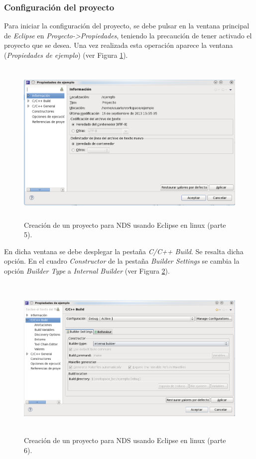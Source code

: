 \subsubsection{Configuración del proyecto}
Para iniciar la configuración del proyecto, se debe pulsar en la ventana principal de \textit{Eclipse} en \textit{Proyecto->Propiedades}, teniendo la precaución de tener activado el proyecto que se desea. Una vez realizada esta operación aparece la ventana (\textit{Propiedades de ejemplo}) (ver Figura \ref{fig_pig_p3_c1_eclipel5}).

\begin{figure}[t]
	\centering
	\includegraphics[height=8cm]{./Figuras/C2/c2_instan5.png}
	\caption{Creación de un proyecto para NDS usando Eclipse en linux (parte 5).}
	\label{fig_pig_p3_c1_eclipel5}
\end{figure}

En dicha ventana se debe desplegar la pestaña \textit{C/C++ Build}. Se resalta dicha opción. En el cuadro \textit{Constructor} de la pestaña \textit{Builder Settings} se cambia la opción \textit{Builder Type} a \textit{Internal Builder} (ver Figura \ref{fig_pig_p3_c1_eclipel6}).


\begin{figure}[t]
	\centering
	\includegraphics[height=8cm]{./Figuras/C2/c2_instan6.png}
	\caption{Creación de un proyecto para NDS usando Eclipse en linux (parte 6).}
	\label{fig_pig_p3_c1_eclipel6}
\end{figure}

